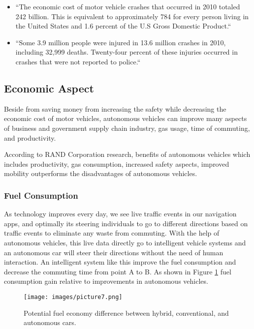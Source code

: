 \documentclass[sigconf]{acmart}
\begin{document}
\begin{itemize}

\item ``The economic cost of motor vehicle crashes that occurred in 2010 totaled 242 billion. This is equivalent to approximately 784 for every person living in the United States and 1.6 percent of the U.S Gross Domestic Product\cite{lawrance}.``

\item ``Some 3.9 million people were injured in 13.6 million cr\-as\-hes in 2010, including 32,999 deaths. Twenty-four percent of these injuries occurred in crashes that were not reported to police\cite{lawrance}.``

\end{itemize}


\subsection{Economic Aspect}
Beside from saving money from increasing the safety while decreasing the economic cost of motor vehicles, autonomous vehicles can improve many aspects of business and government supply chain industry, gas usage, time of commuting, and productivity.

\par According to RAND Corporation research, benefits of aut\-ono\-mous vehicles which includes productivity, gas consumption, increased safety aspects, improved mobility outperforms the disadvantages of autonomous vehicles\cite{RAND}.

\subsubsection{Fuel Consumption}As technology improves every day, we see live traffic events in our navigation apps, and optimally its steering individuals to go to different directions based on traffic events to eliminate any waste from commuting\cite{toronto}. With the help of autonomous vehicles, this live data directly go to intelligent vehicle systems and an autonomous car will steer their directions without the need of human interaction. An intelligent system like this improve the fuel consumption and decrease the commuting time from point A to B\cite{toronto}. As shown in Figure \ref{fig:fuelconsumption} fuel consumption gain relative to improvements in autonomous vehicles\cite{toronto}.

\begin{figure}[!ht]
  \centering
      \texttt{[image: images/picture7.png]}
  \caption{Potential fuel economy difference between hybrid, conventional, and autonomous cars.}\label{fig:fuelconsumption}
\end{figure}
\end{document}
